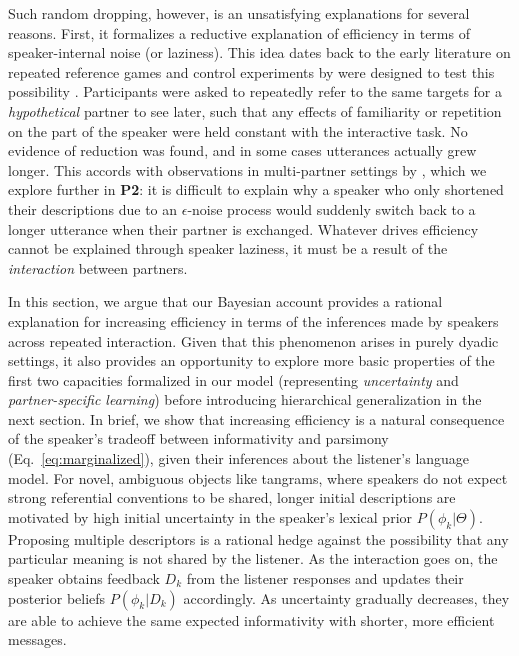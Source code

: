 Such random dropping, however, is an unsatisfying explanations for several reasons.
First, it formalizes a reductive explanation of efficiency in terms of speaker-internal noise (or laziness). This idea dates back to the early literature on repeated reference games and
control experiments by  were designed to test this possibility \cite<see also>{GarrodFayLeeOberlanderMacLeod07_GraphicalSymbolSystems}. 
Participants were asked to repeatedly refer to the same targets for a \emph{hypothetical} partner to see later, such that any effects of familiarity or repetition on the part of the speaker were held constant with the interactive task. 
No evidence of reduction was found, and in some cases utterances actually grew longer.
This accords with observations in multi-partner settings by , which we explore further in \textbf{P2}: it is difficult to explain why a speaker who only shortened their descriptions due to an $\epsilon$-noise process would suddenly switch back to a longer utterance when their partner is exchanged.
Whatever drives efficiency cannot be explained through speaker laziness, it must be a result of the \emph{interaction} between partners.

In this section, we argue that our Bayesian account provides a rational explanation for increasing efficiency in terms of the inferences made by speakers across repeated interaction.
Given that this phenomenon arises in purely dyadic settings, it also provides an opportunity to explore more basic properties of the first two capacities formalized in our model (representing \emph{uncertainty} and \emph{partner-specific learning}) before introducing hierarchical generalization in the next section. 
In brief, we show that increasing efficiency is a natural consequence of the speaker's tradeoff between informativity and parsimony (Eq.~\ref{eq:marginalized}), given their inferences about the listener's language model. 
For novel, ambiguous objects like tangrams, where speakers do not expect strong referential conventions to be shared, longer initial descriptions are motivated by high initial uncertainty in the speaker's lexical prior $P(\phi_k | \Theta)$. 
Proposing multiple descriptors is a rational hedge against the possibility that any particular meaning is not shared by the listener.
As the interaction goes on, the speaker obtains feedback $D_k$ from the listener responses and updates their posterior beliefs $P(\phi_k | D_k)$ accordingly. 
As uncertainty gradually decreases, they are able to achieve the same expected informativity with shorter, more efficient messages. 

